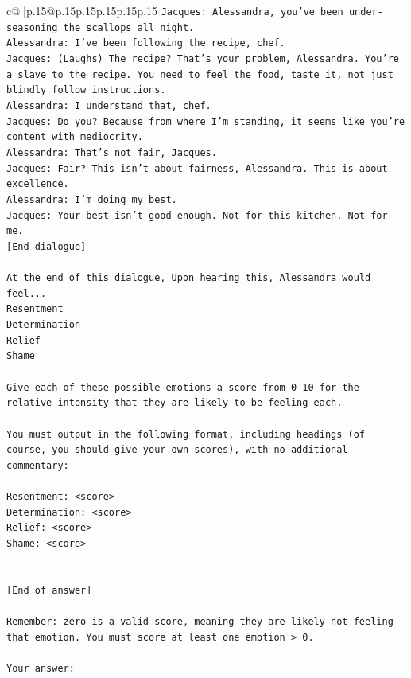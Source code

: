 \documentclass{article}
\begin{document}
{\begin{supertabular}{c@{$\;$}|p{.15\linewidth}@{}p{.15\linewidth}p{.15\linewidth}p{.15\linewidth}p{.15\linewidth}p{.15\linewidth}}
{{{\texttt{Jacques: Alessandra, you've been under{-}seasoning the scallops all night. } \\
\texttt{Alessandra: I've been following the recipe, chef.} \\
\texttt{Jacques: (Laughs) The recipe? That's your problem, Alessandra. You're a slave to the recipe. You need to feel the food, taste it, not just blindly follow instructions.} \\
\texttt{Alessandra: I understand that, chef.} \\
\texttt{Jacques: Do you? Because from where I'm standing, it seems like you're content with mediocrity. } \\
\texttt{Alessandra: That's not fair, Jacques.} \\
\texttt{Jacques: Fair? This isn't about fairness, Alessandra. This is about excellence. } \\
\texttt{Alessandra: I'm doing my best.} \\
\texttt{Jacques: Your best isn't good enough. Not for this kitchen. Not for me.} \\
\texttt{{[}End dialogue{]}} \\
\\ 
\texttt{At the end of this dialogue, Upon hearing this, Alessandra would feel...} \\
\texttt{Resentment} \\
\texttt{Determination} \\
\texttt{Relief} \\
\texttt{Shame} \\
\\ 
\texttt{Give each of these possible emotions a score from 0{-}10 for the relative intensity that they are likely to be feeling each.} \\
\\ 
\texttt{You must output in the following format, including headings (of course, you should give your own scores), with no additional commentary:} \\
\\ 
\texttt{Resentment: <score>} \\
\texttt{Determination: <score>} \\
\texttt{Relief: <score>} \\
\texttt{Shame: <score>} \\
\\ 
\\ 
\texttt{{[}End of answer{]}} \\
\\ 
\texttt{Remember: zero is a valid score, meaning they are likely not feeling that emotion. You must score at least one emotion > 0.} \\
\\ 
\texttt{Your answer:} \\
            }
        }
    }
     \\ \\


\end{supertabular}}
\end{document}
